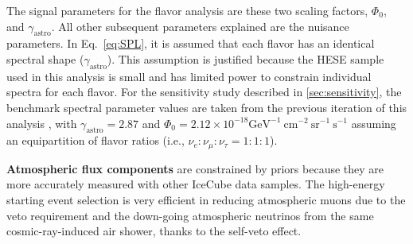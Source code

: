 The signal parameters for the flavor analysis are these two scaling factors, $\Phi_{\mathrm{0}}$, and $\gamma_{\mathrm{astro}}$. All other subsequent parameters explained are the nuisance parameters. In Eq.~\ref{eq:SPL}, it is assumed that each flavor has an identical spectral shape ($\gamma_{\mathrm{astro}}$). This assumption is justified because the HESE sample used in this analysis is small and has limited power to constrain individual spectra for each flavor. For the sensitivity study described in \ref{sec:sensitivity}, the benchmark spectral parameter values are taken from the previous iteration of this analysis , with $\gamma_{\mathrm{astro}} = 2.87$ and $\Phi_{\mathrm{0}} = 2.12 \times 10^{-18} \mathrm{GeV}^{-1}\ \mathrm{cm}^{-2}\ \mathrm{sr}^{-1}\ \mathrm{s}^{-1}$ assuming an equipartition of flavor ratios (i.e., $\nu_e : \nu_{\mu} : \nu_{\tau} = 1:1:1$).

\textbf{Atmospheric flux components} are constrained by priors because they are more accurately measured with other IceCube data samples. The high-energy starting event selection is very efficient in reducing atmospheric muons due to the veto requirement and the down-going atmospheric neutrinos from the same cosmic-ray-induced air shower, thanks to the self-veto effect.

